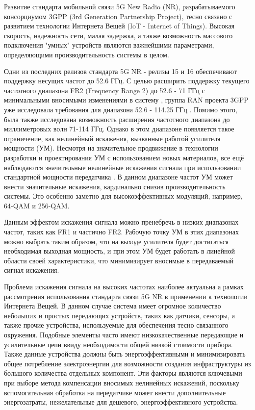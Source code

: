 \Introduction

Развитие стандарта мобильной связи 5G New Radio (NR), разрабатываемого консорциумом
3GPP (3rd Generation Partnership Project), тесно связано с развитием
технологии Интернета Вещей (IoT - Internet of Things). Высокая скорость,
надежность сети, малая задержка, а также возможность массового подключения
"умных" устройств являются важнейшими параметрами, определяющими
производительность системы в целом.

Одни из последних релизов стандарта 5G NR - релизы 15 и 16 обеспечивают
поддержку несущих частот до 52.6 ГГц. С целью расширить поддержку текущего
частотного диапазона FR2 (Frequency Range 2) до 52.6 - 71 ГГц с
минимальными вносимыми изменениями в систему \cite{intel193259}
\cite{qlcm193229}, группа RAN проекта 3GPP уже исследовала требования для
диапазона 52.6 - 114.25 ГГц \cite{3gpp.38.807}. Помимо этого, была также
исследована возможность расширения частотного диапазона до миллиметровых
волн 71-114 ГГц. Однако в этом диапазоне появляется такое ограничение, как
нелинейный искажения, вызванные работой усилителя мощности (УМ). Несмотря
на значительное продвижение в технологии разработки и проектирования УМ с
использованием новых материалов, все ещё наблюдаются значительные нелинейные
искажения сигнала при использовании стандартной мощности передатчика
\cite{zhang2021}. В данном диапазоне частот УМ может внести значительные
искажения, кардинально снизив производительность
системы. Это особенно заметно для высокоэффективных модуляций, например,
64-QAM и 256-QAM.

Данным эффектом искажения сигнала можно пренебречь в низких диапазонах
частот, таких как FR1 и частично FR2. Рабочую точку УМ в этих диапазонах
можно выбрать таким образом, что на выходе усилителя будет достигаться
необходимая выходная мощность, и при этом УМ будет работать в линейной
области своей характеристики, что минимизирует вносимые в передаваемый
сигнал искажения.

Проблема искажения сигнала на высоких частотах наиболее актуальна а рамках
рассмотрения использования стандарта связи 5G NR в применении к технологии
Интернета Вещей. В данном случае система имеет огромное количество
небольших и простых передающих устройств, таких как датчики, сенсоры, а
также прочие устройства, используемые для обеспечения тесно
связанного окружения. Подобные элементы часто имеют низкокачественные
передающие и усилительные цепи ввиду необходимости общей низкой стоимости
прибора. Также данные устройства должны быть энергоэффективными и
минимизировать общее потребление электроэнергии для возможности создания
инфраструктуры из большого количества отдельных компонент.
Эти факторы являются ключевыми при выборе метода компенсации вносимых
нелинейных искажений, поскольку вспомогательная обработка на передатчике
может внести дополнительные энергозатраты, нежелательные для дешевого,
энергоэффективного устройства.

